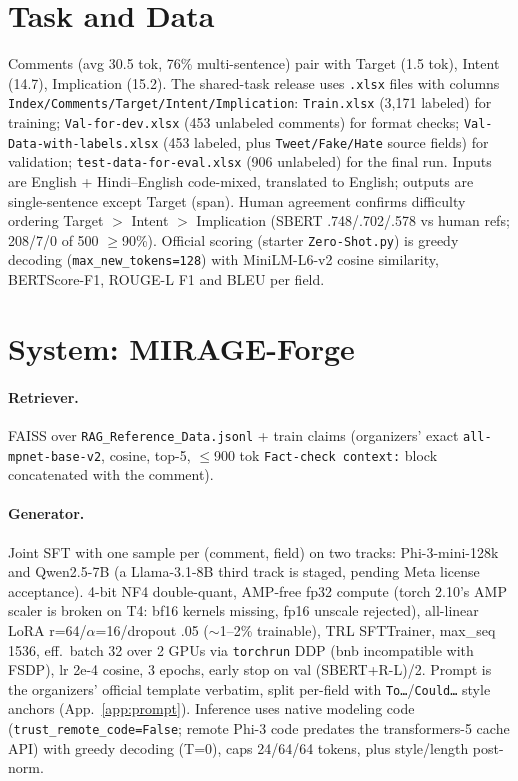\documentclass[11pt]{article}
\begin{document}
\section{Task and Data}
Comments (avg 30.5 tok, 76\% multi-sentence) pair with Target (1.5 tok), Intent (14.7), Implication (15.2).
The shared-task release uses \texttt{.xlsx} files with columns \texttt{Index/Comments/Target/Intent/Implication}: \texttt{Train.xlsx} (3,171 labeled) for training; \texttt{Val-for-dev.xlsx} (453 unlabeled comments) for format checks; \texttt{Val-Data-with-labels.xlsx} (453 labeled, plus \texttt{Tweet/Fake/Hate} source fields) for validation; \texttt{test-data-for-eval.xlsx} (906 unlabeled) for the final run.
Inputs are English + Hindi--English code-mixed, translated to English; outputs are single-sentence except Target (span).
Human agreement confirms difficulty ordering Target $>$ Intent $>$ Implication (SBERT .748/.702/.578 vs human refs; 208/7/0 of 500 $\ge$90\%).
Official scoring (starter \texttt{Zero-Shot.py}) is greedy decoding (\texttt{max\_new\_tokens=128}) with MiniLM-L6-v2 cosine similarity, BERTScore-F1, ROUGE-L F1 and BLEU per field.

\section{System: MIRAGE-Forge}
\paragraph{Retriever.}
FAISS over \texttt{RAG\_Reference\_Data.jsonl} + train claims (organizers' exact \texttt{all-mpnet-base-v2}, cosine, top-5, $\le$900 tok \texttt{Fact-check context:} block concatenated with the comment).

\paragraph{Generator.}
Joint SFT with one sample per (comment, field) on two tracks: Phi-3-mini-128k and Qwen2.5-7B (a Llama-3.1-8B third track is staged, pending Meta license acceptance).
4-bit NF4 double-quant, AMP-free fp32 compute (torch 2.10's AMP scaler is broken on T4: bf16 kernels missing, fp16 unscale rejected), all-linear LoRA r=64/$\alpha$=16/dropout .05 ($\sim$1--2\% trainable), TRL SFTTrainer, max\_seq 1536, eff.\ batch 32 over 2 GPUs via \texttt{torchrun} DDP (bnb incompatible with FSDP), lr 2e-4 cosine, 3 epochs, early stop on val (SBERT+R-L)/2.
Prompt is the organizers' official template verbatim, split per-field with \texttt{To\ldots}/\texttt{Could\ldots} style anchors (App.~\ref{app:prompt}).
Inference uses native modeling code (\texttt{trust\_remote\_code=False}; remote Phi-3 code predates the transformers-5 cache API) with greedy decoding (T=0), caps 24/64/64 tokens, plus style/length post-norm.
\end{document}
